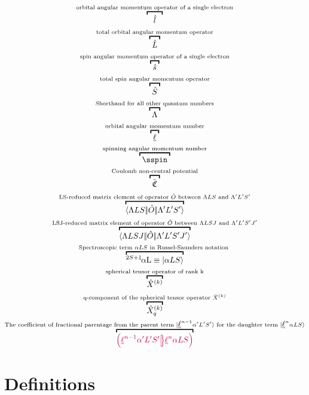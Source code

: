\documentclass{article}
\begin{document}
\begin{gather}
    \overbracket{\,\,\,\,\,\op{l}\,\,\,\,\,}^{\text{orbital angular momentum operator of a single electron}} \\
    \overbracket{\,\,\op{L}\,\,}^{\text{total orbital angular momentum  operator}} \\
    \overbracket{\,\,\op{s}\,\,}^{\text{spin angular momentum  operator of a single electron}} \\
    \overbracket{\,\,\op{S}\,\,}^{\text{total spin angular momentum operator}} \\
    \overbracket{\,\,\Lambda\,\,}^{\text{Shorthand for all other quantum numbers}} \\ 
    \overbracket{\,\,\lorb\,\,}^{\text{orbital angular momentum number}} \\
    \overbracket{\,\,\sspin\,\,}^{\text{spinning angular momentum number}} \\
    \overbracket{\,\,\CoulombNonCentral\,\,}^{\text{Coulomb non-central potential}} \\
    \overbracket{\redbraopket{\Lambda LS}{\op{O}}{\Lambda' L'S'}}^{\text{LS-reduced matrix element of operator }\hat{O}\text{ between }{\Lambda LS} \text{ and } {\Lambda' L'S'}} \\
    \overbracket{\redbraopket{\Lambda LSJ}{\op{O}}{\Lambda' L'S'J'}}^{\text{LSJ-reduced matrix element of operator }\hat{O}\text{ between }{\Lambda LSJ} \text{ and } {\Lambda' L'S'J'}} \\
    \overbracket{\LSterm{2 S + 1}{$\alpha$L}\equiv \ket{\alpha{LS}}}^{\text{Spectroscopic term } {\alpha{LS}} \text{ in Russel-Saunders notation }} \\
    \overbracket{\op{X}^{(k)}}^{\text{spherical tensor operator of rank k}} \\
    \overbracket{\op{X}_q^{(k)}}^{\text{q-component of the spherical tensor operator }\op{X}^{(k)}} \\
    \overbracket{\cfp{\lorb^{n-1}\alpha'L'S'}{\lorb^n\alpha{L}{S}}}^{\text{The coefficient of fractional parentage from the parent term }\ket{\lorb^{n-1}\alpha'{L'S'}}\text{ for the daughter term }\ket{\lorb^{n}\alpha{LS}}}  
\end{gather}



\section{Definitions}  
\end{document}
